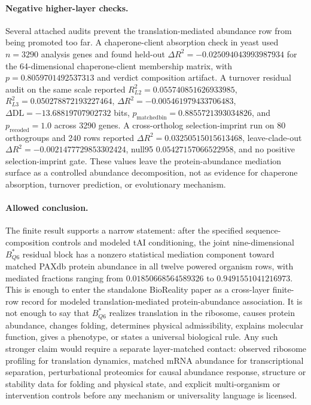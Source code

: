 \paragraph{Negative higher-layer checks.}
Several attached audits prevent the translation-mediated abundance row from being promoted too far.  A chaperone-client absorption check in yeast used $n=3290$ analysis genes and found held-out $\Delta R^2=-0.025094043993987934$ for the 64-dimensional chaperone-client membership matrix, with $p=0.8059701492537313$ and verdict composition artifact.  A turnover residual audit on the same scale reported $R^2_{L2}=0.055740851626933985$, $R^2_{L3}=0.050278872193227464$, $\Delta R^2=-0.005461979433706483$, $\Delta\mathrm{DL}=-13.68819707902732$ bits, $p_{\mathrm{matchedbin}}=0.8855721393034826$, and $p_{\mathrm{recoded}}=1.0$ across 3290 genes.  A cross-ortholog selection-imprint run on 80 orthogroups and 240 rows reported $\Delta R^2=0.03250515015613468$, leave-clade-out $\Delta R^2=-0.0021477729853302424$, null95 $0.05427157066522958$, and no positive selection-imprint gate.  These values leave the protein-abundance mediation surface as a controlled abundance decomposition, not as evidence for chaperone absorption, turnover prediction, or evolutionary mechanism.

\paragraph{Allowed conclusion.}
The finite result supports a narrow statement: after the specified sequence-composition controls and modeled tAI conditioning, the joint nine-dimensional $B^{*}_{Q6}$ residual block has a nonzero statistical mediation component toward matched PAXdb protein abundance in all twelve powered organism rows, with mediated fractions ranging from $0.01850668564589326$ to $0.9491551041216973$.  This is enough to enter the standalone BioReality paper as a cross-layer finite-row record for modeled translation-mediated protein-abundance association.  It is not enough to say that $B^{*}_{Q6}$ realizes translation in the ribosome, causes protein abundance, changes folding, determines physical admissibility, explains molecular function, gives a phenotype, or states a universal biological rule.  Any such stronger claim would require a separate layer-matched contact: observed ribosome profiling for translation dynamics, matched mRNA abundance for transcriptional separation, perturbational proteomics for causal abundance response, structure or stability data for folding and physical state, and explicit multi-organism or intervention controls before any mechanism or universality language is licensed.

